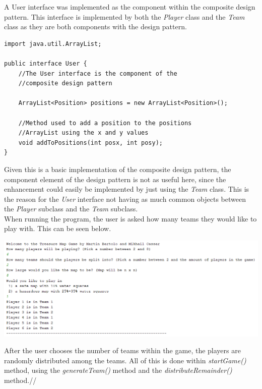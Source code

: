 \documentclass[a4paper,12pt]{extarticle}
\begin{document}
\noindent A User interface was implemented as the component within the composite design pattern. This interface is implemented by both the \textit{Player} class and the \textit{Team} class as they are both components with the design pattern.\\

\vspace{-1mm}
\begin{lstlisting}
import java.util.ArrayList;

public interface User {
    //The User interface is the component of the 
    //composite design pattern

    ArrayList<Position> positions = new ArrayList<Position>();

    //Method used to add a position to the positions 
    //ArrayList using the x and y values
    void addToPositions(int posx, int posy);
}
\end{lstlisting}
\vspace{4mm}

\noindent Given this is a basic implementation of the composite design pattern, the component element of the design pattern is not as useful here, since the enhancement could easily be implemented by just using the \textit{Team} class. This is the reason for the \textit{User} interface not having as much common objects between the \textit{Player} subclass and the \textit{Team} subclass.\\

\noindent When running the program, the user is asked how many teams they would like to play with. This can be seen below.

\begin{center}
\includegraphics[scale=0.5]{Team3.png}\\
\end{center}

\noindent After the user chooses the number of teams within the game, the players are randomly distributed among the teams. All of this is done within \textit{startGame()} method, using the \textit{generateTeam()} method and the \textit{distributeRemainder()} method.//
\vspace{4mm}
\end{document}
